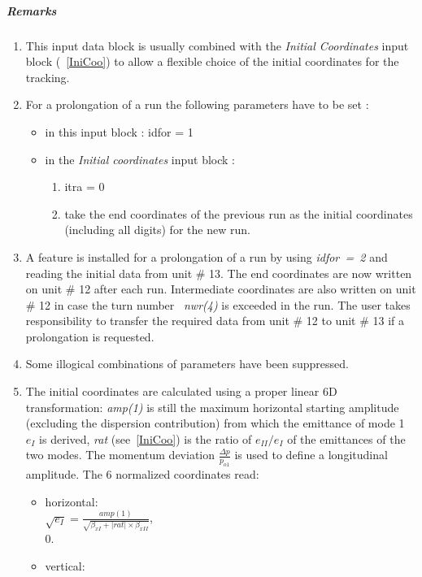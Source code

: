 \documentclass[a4paper,11pt]{report}
\begin{document}
\subparagraph{Remarks}
\begin{enumerate}
\item This input data block is usually combined with the {\em Initial
    Coordinates} \/input block (~\ref{IniCoo}) to allow a flexible
  choice of the initial coordinates for the tracking.
\item For a prolongation of a run the following parameters have to be
  set :
\begin{itemize}
\item in this input block : idfor = 1
\item in the {\em Initial coordinates} \/input block :
\begin{enumerate}
\item itra = 0
\item take the end coordinates of the previous run as the initial
  coordinates (including all digits) for the new run.
\end{enumerate}
\end{itemize}
\item A feature is installed for a prolongation of a run by using
  \mbox{\em idfor = 2} \/and 
  reading the initial data from unit \# 13. The end coordinates are
  now written on unit \# 12 after each run. Intermediate coordinates
  are also written on unit \# 12 in case the turn number \mbox{\em
    nwr(4)} \/is exceeded in the run. The user takes responsibility to
  transfer the required data from unit \# 12 to unit \# 13 if a
  prolongation is requested.
\item Some illogical combinations of parameters have been suppressed.
\item The initial coordinates are calculated using a proper linear 6D
  transformation: {\em amp(1)} \/is still the maximum horizontal
  starting amplitude (excluding the dispersion contribution) from
  which the emittance of mode 1 $e_I$ is derived, {\em rat}
  \/(see~\ref{IniCoo}) is the ratio of $e_{II}/e_I$ of the emittances
  of the two modes. The momentum deviation $\frac{\Delta p}{p_{o1}}$ is used to
  define a longitudinal amplitude. The 6 normalized coordinates read:
\begin{itemize}
\item horizontal:\\

  $\sqrt{e_I}=\frac{amp(1)}{\sqrt{\beta_{xI}+\left|rat\right|\times
        \beta_{xII}}}$,\\

  $0.$

\item vertical: \\


\end{itemize}
\end{enumerate}
\end{document}
